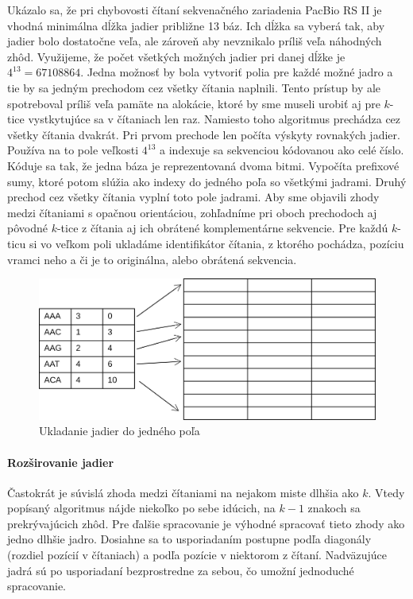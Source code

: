 Ukázalo sa, že pri chybovosti čítaní sekvenačného zariadenia PacBio RS II je vhodná minimálna dĺžka jadier približne 13 báz. Ich dĺžka sa vyberá tak, aby jadier bolo dostatočne veľa, ale zároveň aby nevznikalo príliš veľa náhodných zhôd. Využijeme, že počet všetkých možných jadier pri danej dĺžke je $4^{13} = 67108864$. Jedna možnosť by bola vytvoriť polia pre každé možné jadro a tie by sa jedným prechodom cez všetky čítania naplnili. Tento prístup by ale spotreboval príliš veľa pamäte na alokácie, ktoré by sme museli urobiť aj pre $k$-tice vystkytujúce sa v čítaniach len raz. Namiesto toho algoritmus prechádza cez všetky čítania dvakrát. Pri prvom prechode len počíta výskyty rovnakých jadier. Používa na to pole veľkosti $4^{13}$ a indexuje sa sekvenciou kódovanou ako celé číslo. Kóduje sa tak, že jedna báza je reprezentovaná dvoma bitmi. Vypočíta prefixové sumy, ktoré potom slúžia ako indexy do jedného poľa so všetkými jadrami. Druhý prechod cez všetky čítania vyplní toto pole jadrami. Aby sme objavili zhody medzi čítaniami s opačnou orientáciou, zohľadníme pri oboch prechodoch aj pôvodné $k$-tice z čítania aj ich obrátené komplementárne sekvencie. Pre každú $k$-ticu si vo veľkom poli ukladáme identifikátor čítania, z ktorého pochádza, pozíciu vramci neho a či je to originálna, alebo obrátená sekvencia. 

\begin{figure}
    \centering
    \includegraphics[width=1\textwidth]{images/jadra_velke_pole.png}
    \caption{Ukladanie jadier do jedného poľa}
    \label{fig:velke_pole}
\end{figure} 

\paragraph{Rozširovanie jadier}

Častokrát je súvislá zhoda medzi čítaniami na nejakom miste dlhšia ako $k$. Vtedy popísaný algoritmus nájde niekoľko po sebe idúcich, na $k - 1$ znakoch sa prekrývajúcich zhôd. Pre ďalšie spracovanie je výhodné spracovať tieto zhody ako jedno dlhšie jadro. Dosiahne sa to usporiadaním postupne podľa diagonály (rozdiel pozícií v čítaniach) a podľa pozície v niektorom z čítaní. Nadväzujúce jadrá sú po usporiadaní bezprostredne za sebou, čo umožní jednoduché spracovanie.

